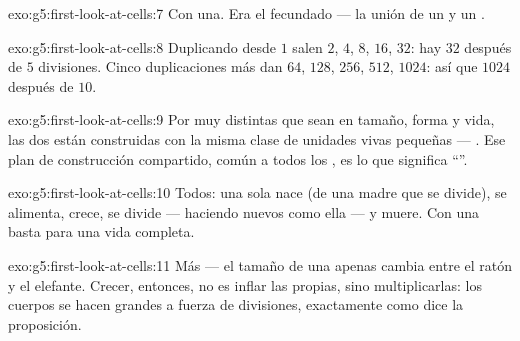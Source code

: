 \begin{solution}{exo:g5:first-look-at-cells:7}
Con una. Era el  fecundado --- la unión de un  y un
.
\end{solution}

\begin{solution}{exo:g5:first-look-at-cells:8}
Duplicando desde $1$ salen $2$, $4$, $8$, $16$, $32$: hay $32$ 
después de $5$ divisiones. Cinco duplicaciones más dan $64$, $128$,
$256$, $512$, $1024$: así que $1024$  después de $10$.
\end{solution}

\begin{solution}{exo:g5:first-look-at-cells:9}
Por muy distintas que sean en tamaño, forma y vida, las dos están
construidas con la misma clase de unidades vivas pequeñas --- .
Ese plan de construcción compartido, común a todos los , es
lo que significa ``''.
\end{solution}

\begin{solution}{exo:g5:first-look-at-cells:10}
Todos: una sola  nace (de una  madre que se divide), se
alimenta, crece, se divide --- haciendo  nuevos como ella
--- y muere. Con una  basta para una vida completa.
\end{solution}

\begin{solution}{exo:g5:first-look-at-cells:11}
Más  --- el tamaño de una  apenas cambia entre el ratón y
el elefante. Crecer, entonces, no es inflar las  propias, sino
multiplicarlas: los cuerpos se hacen grandes a fuerza de divisiones,
exactamente como dice la proposición.
\end{solution}
